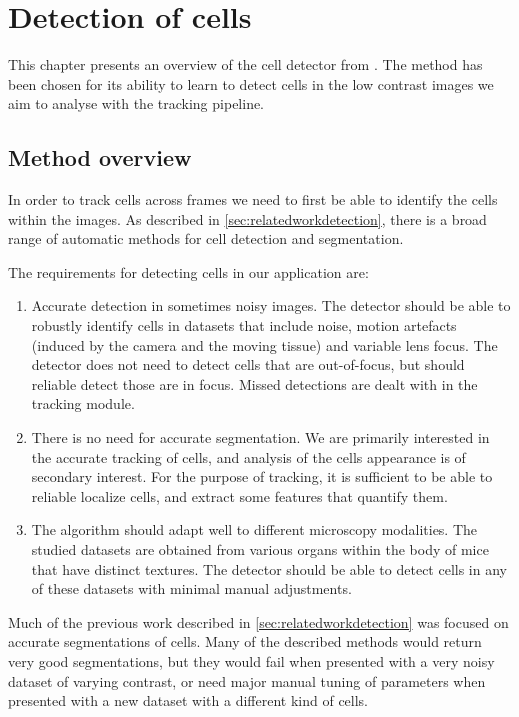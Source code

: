 \chapter{Detection of cells \statusfirstdraft}
	\label{chap:cell_detection}
	
	
	This chapter presents an overview of the cell detector from \cite{arteta12}. The method has been chosen for its ability to learn to detect cells in the low contrast images we aim to analyse with the tracking pipeline.
	
	\section{Method overview \statusfirstdraft}
	
	In order to track cells across frames we need to first be able to identify the cells within the images. As described in \cref{sec:relatedworkdetection}, there is a broad range of automatic methods for cell detection and segmentation.
	
	The requirements for detecting cells in our application are:
		
	\begin{enumerate}
	\item Accurate detection in sometimes noisy images. The detector should be able to robustly identify cells in datasets that include noise, motion artefacts (induced by the camera and the moving tissue) and variable lens focus. The detector does not need to detect cells that are out-of-focus, but should reliable detect those are in focus. Missed detections are dealt with in the tracking module.
	
	\item There is no need for accurate segmentation. We are primarily interested in the accurate tracking of cells, and analysis of the cells appearance is of secondary interest. For the purpose of tracking, it is sufficient to be able to reliable localize cells, and extract some features that quantify them.
	
	\item The algorithm should adapt well to different microscopy modalities. The studied datasets are obtained from various organs within the body of mice that have distinct textures. The detector should be able to detect cells in any of these datasets with minimal  manual adjustments.
	\end{enumerate}
	
	Much of the previous work described in \cref{sec:relatedworkdetection} was focused on accurate segmentations of cells. Many of the described methods would return very good segmentations, but they would fail when presented with a very noisy dataset of varying contrast, or need major manual tuning of parameters when presented with a new dataset with a different kind of cells.
	
